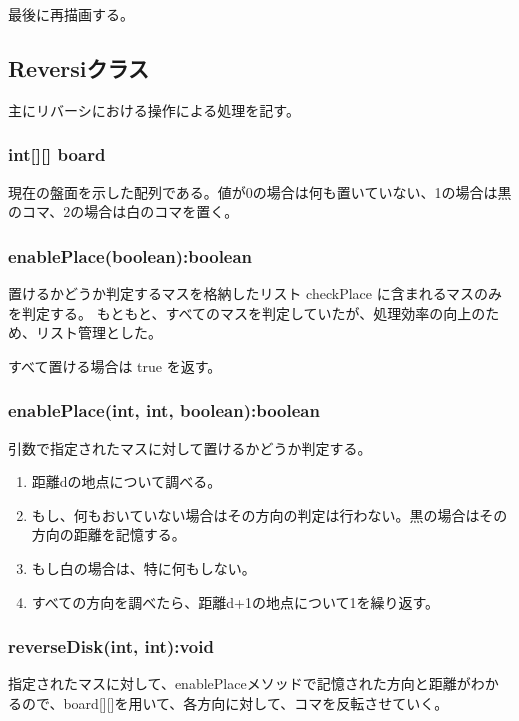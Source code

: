 \documentclass[10.5pt, a4paper]{jsarticle}
\begin{document}
最後に再描画する。

\newpage

\subsection*{Reversiクラス}

主にリバーシにおける操作による処理を記す。

\subsubsection*{int[][] board}
現在の盤面を示した配列である。値が0の場合は何も置いていない、1の場合は黒のコマ、2の場合は白のコマを置く。

\subsubsection*{enablePlace(boolean):boolean}

置けるかどうか判定するマスを格納したリスト checkPlace に含まれるマスのみを判定する。
もともと、すべてのマスを判定していたが、処理効率の向上のため、リスト管理とした。

すべて置ける場合は true を返す。

\subsubsection*{enablePlace(int, int, boolean):boolean}

引数で指定されたマスに対して置けるかどうか判定する。

\begin{enumerate}
    \item 距離dの地点について調べる。
    \item もし、何もおいていない場合はその方向の判定は行わない。黒の場合はその方向の距離を記憶する。
    \item もし白の場合は、特に何もしない。
    \item すべての方向を調べたら、距離d+1の地点について1を繰り返す。
\end{enumerate}

\subsubsection*{reverseDisk(int, int):void}

指定されたマスに対して、enablePlaceメソッドで記憶された方向と距離がわかるので、board[][]を用いて、各方向に対して、コマを反転させていく。
\end{document}
